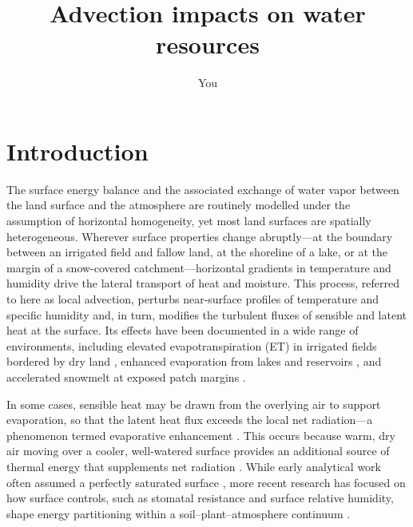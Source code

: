 \documentclass{article}
\title{Advection impacts on water resources}
\author{You}
\begin{document}
    
    \begin{abstract}
    
    \end{abstract}
    
    
    
\section{Introduction}


The surface energy balance and the associated exchange of water vapor between the land surface and the atmosphere are routinely modelled under the assumption of horizontal homogeneity, yet most land surfaces are spatially heterogeneous.
Wherever surface properties change abruptly---at the boundary between an irrigated field and fallow land, at the shoreline of a lake, or at the margin of a snow-covered catchment---horizontal gradients in temperature and humidity drive the lateral transport of heat and moisture.
This process, referred to here as local advection, perturbs near-surface profiles of temperature and specific humidity and, in turn, modifies the turbulent fluxes of sensible and latent heat at the surface.
Its effects have been documented in a wide range of environments, including elevated evapotranspiration (ET) in irrigated fields bordered by dry land \citep{rao1974local}, enhanced evaporation from lakes and reservoirs \citep{higgins2013measured}, and accelerated snowmelt at exposed patch margins \citep{shook1997snowmelt, essery2006boundary}.

In some cases, sensible heat may be drawn from the overlying air to support evaporation, so that the latent heat flux exceeds the local net radiation---a phenomenon termed evaporative enhancement \citep{yang2013new, kool_within-field_2018}.
This occurs because warm, dry air moving over a cooler, well-watered surface provides an additional source of thermal energy that supplements net radiation \cite{spronken2000advection}.
While early analytical work often assumed a perfectly saturated surface \cite{lang1974influence, rao1974local}, more recent research has focused on how surface controls, such as stomatal resistance and surface relative humidity, shape energy partitioning within a soil--plant--atmosphere continuum \cite{baldocchi1995intra}.
\end{document}
